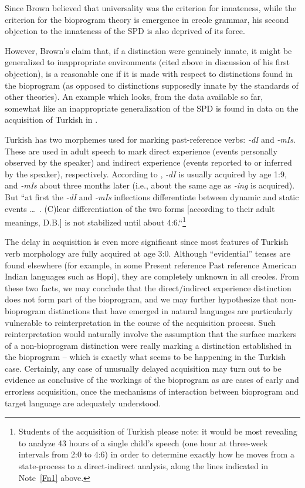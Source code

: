 Since Brown believed that universality was the criterion for innateness, while the criterion for the bioprogram theory is emergence
in creole grammar, his second objection to the innateness of the SPD is also deprived of its force.

However, Brown's claim that, if a distinction were genuinely innate, it might be generalized to inappropriate environments (cited above in discussion of his first objection), is a reasonable one if it is made with respect to distinctions found in the bioprogram (as opposed to distinctions supposedly innate by the standards of other theories). An example which looks, from the data available so far, somewhat like an inappropriate generalization of the SPD is found in data on the
acquisition of Turkish in \citet{SlobinEtAl1980}.

Turkish has two morphemes used for marking past-reference verbs: \textit{-dI} and \textit{-mIs}. These are used in adult speech to mark direct experience (events personally observed by the speaker) and indirect experience (events reported to or inferred by the speaker), respectively. According to \citeauthor{SlobinEtAl1980}, \textit{-dI} is usually acquired by age 1:9, and \textit{-mIs} about three months later (i.e., about the same age as \textit{-ing} is acquired). But ``at first the \textit{-dI} and \textit{-mIs} inflections differentiate between dynamic and static events \ldots~. (C)lear differentiation of the two forms [according to their adult meanings, D.B.] is not stabilized until about 4:6.``\footnote{Students of the acquisition of Turkish please note: it would be most revealing to analyze 43 hours of a single child's speech (one hour at three-week intervals from 2:0 to 4:6) in order to determine exactly how he moves from a state-process to a direct-indirect analysis, along the lines indicated in Note~\ref{Fn1} above.}

The delay in acquisition is even more significant since most features of Turkish verb morphology are fully acquired at age 3:0. Although ``evidential'' tenses are found elsewhere (for example, in some Present reference Past reference American Indian languages such as Hopi), they are completely un\-known in all creoles. From these two facts, we may conclude that the direct/indirect experience distinction does not form part of the bio\-program, and we may further hypothesize that non-bioprogram distinctions that have emerged in natural languages are particularly vulnerable to reinterpretation in the course of the acquisition process. Such reinterpretation would naturally involve the assumption that the surface markers of a non-bioprogram distinction were really marking a distinction established in the bioprogram -- which is exactly what seems to be happening in the Turkish case. Certainly, any case of unusually delayed acquisition may turn out to be evidence as conclusive
of the workings of the bioprogram as are cases of early and errorless acquisition, once the mechanisms of interaction between bioprogram and target language are adequately understood.

